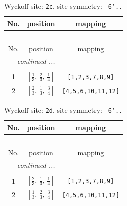 \documentclass[fleqn,8pt]{jsarticle}
\begin{document}
\renewcommand{\arraystretch}{1.2}
\begin{longtable}{ccc}
\caption{Wyckoff site: {\tt 2c}, site symmetry: {\tt -6'..}}
 \\
 \hline \hline
No. & position & mapping \\ \hline \endfirsthead

\multicolumn{2}{l}{\tablename\ \thetable{}} \\
 \hline \hline
No. & position & mapping \\ \hline \endhead

 \hline \hline
\multicolumn{2}{r}{\footnotesize\it continued ...} \\ \endfoot

 \hline \hline
\multicolumn{2}{r}{} \\ \endlastfoot

1 & $\left[ \frac{1}{3},\, \frac{2}{3},\, \frac{1}{4} \right]$ & {\tt [1,2,3,7,8,9]} \\ \hline
2 & $\left[ \frac{2}{3},\, \frac{1}{3},\, \frac{3}{4} \right]$ & {\tt [4,5,6,10,11,12]} \\
\end{longtable}
\renewcommand{\arraystretch}{1.2}
\begin{longtable}{ccc}
\caption{Wyckoff site: {\tt 2d}, site symmetry: {\tt -6'..}}
 \\
 \hline \hline
No. & position & mapping \\ \hline \endfirsthead

\multicolumn{2}{l}{\tablename\ \thetable{}} \\
 \hline \hline
No. & position & mapping \\ \hline \endhead

 \hline \hline
\multicolumn{2}{r}{\footnotesize\it continued ...} \\ \endfoot

 \hline \hline
\multicolumn{2}{r}{} \\ \endlastfoot

1 & $\left[ \frac{2}{3},\, \frac{1}{3},\, \frac{1}{4} \right]$ & {\tt [1,2,3,7,8,9]} \\ \hline
2 & $\left[ \frac{1}{3},\, \frac{2}{3},\, \frac{3}{4} \right]$ & {\tt [4,5,6,10,11,12]} \\
\end{longtable}
\renewcommand{\arraystretch}{1.2}
\end{document}
